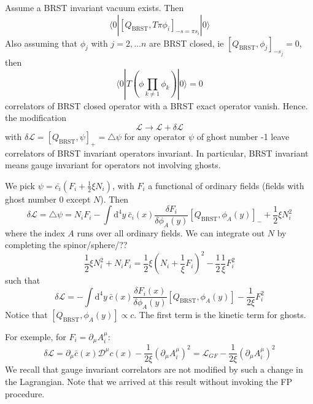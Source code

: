 \documentclass[a4paper]{book}
\theoremstyle{definition}
\theoremstyle{remark}
\begin{document}
Assume a BRST invariant vacuum exists. Then 
\begin{equation}
    \langle 0| [Q_{\text{BRST}} , T{\pi\phi_i}]_{-s = \pi s_i} |0\rangle 
\end{equation}
Also assuming that $\phi_j$ with $j = 2, \dots n$ are BRST closed, ie $[Q_{\text{BRST}}, \phi_j]_{-s_j} = 0$, then 
\begin{equation}
    \langle 0| T(\phi \prod_{k\neq 1}\phi_k)|0\rangle = 0
\end{equation}
correlators of BRST closed operator with a BRST exact operator vanish. Hence. the modification 
\begin{equation}
    \mathcal L \rightarrow \mathcal L + \delta \mathcal L 
\end{equation}
with $\delta \mathcal L = [Q_{\text{BRST}}, \psi]_+ = \triangle \psi$ for any operator $\psi$ of ghost number -1 leave correlators of BRST invariant operators invariant. In particular, BRST invariant means gauge invariant for operators not involving ghosts. \par \medskip 

We pick $\psi = \bar{c_i}(F_i + \frac{1}{2}\xi N_i)$, with $F_i$ a functional of ordinary fields (fields with ghost number 0 except $N$). Then 
\begin{equation}
    \delta \mathcal L = \triangle \psi = N_i F_i - \int \text{d}^4 y ~\bar{c}_i(x) \frac{\delta F_i}{\delta \phi_A(y)}[Q_{\text{BRST}}, \phi_A (y)]_- + \frac{1}{2}\xi N_i^2
\end{equation}
where the index $A$ runs over all ordinary fields. We can integrate out $N$ by completing the spinor/sphere/?? 
\begin{equation}
    \frac{1}{2}\xi N_i^2 + N_i F_i = \frac{1}{2}\xi (N_i + \frac{1}{\xi}F_i)^2 - \frac{1}{2}\frac{1}{\xi}F_i^2
\end{equation}
such that 
\begin{equation}
    \delta \mathcal L = - \int \text{d}^4 y ~ \bar{c}(x)\frac{\delta F_i(x)}{\delta \phi_A(y)}[Q_{\text{BRST}}, \phi_A(y)] - \frac{1}{2\xi}F_i^2
\end{equation}
Notice that $[Q_{\text{BRST}}, \phi_A(y)] \propto c$. The first term is the kinetic term for ghosts. \par \medskip 

For exemple, for $F_i = \partial_\mu A^\mu _i$:
\begin{equation}
    \delta \mathcal L = \partial_\mu \bar{c}(x) \mathcal D ^\mu c(x) - \frac{1}{2\xi}(\partial_\mu A^\mu_i)^2 = \mathcal L _{GF} - \frac{1}{2\xi}(\partial_\mu A^\mu_i)^2 
\end{equation}
We recall that gauge invariant correlators are not modified by such a change in the Lagrangian. Note that we arrived at this result without invoking the FP procedure. 
\end{document}
